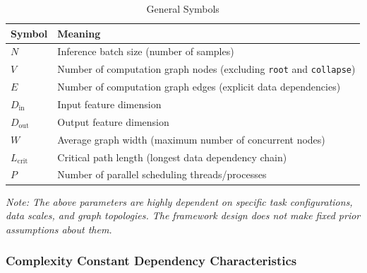 \begin{table}[htbp]
    \centering
    \caption{General Symbols}
    \label{tab:symbols_general}
    \begin{tabular}{ll}
        \toprule
        \textbf{Symbol} & \textbf{Meaning} \\
        \midrule
        $N$ & Inference batch size (number of samples) \\
        $V$ & Number of computation graph nodes (excluding \texttt{root} and \texttt{collapse}) \\
        $E$ & Number of computation graph edges (explicit data dependencies) \\
        $D_{\mathrm{in}}$ & Input feature dimension \\
        $D_{\mathrm{out}}$ & Output feature dimension \\
        $W$ & Average graph width (maximum number of concurrent nodes) \\
        $L_{\mathrm{crit}}$ & Critical path length (longest data dependency chain) \\
        $P$ & Number of parallel scheduling threads/processes \\
        \bottomrule
    \end{tabular}
\end{table}

\textit{Note: The above parameters are highly dependent on specific task configurations, data scales, and graph topologies. The framework design does not make fixed prior assumptions about them.}

\subsubsection{Complexity Constant Dependency Characteristics}

